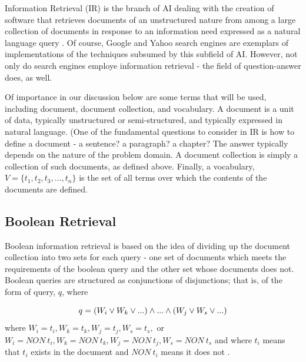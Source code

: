 Information Retrieval (IR) is the branch of AI dealing with the creation of software that retrieves documents of an unstructured nature from among a large collection of documents in response to an information need expressed as a natural language query \cite{manning_2008_introduction_ch1}.   Of course, Google and Yahoo search engines are exemplars of implementations of the techniques subsumed by this subfield of AI.  However, not only do search engines employe information retrieval - the field of question-answer does, as well.  

Of importance in our discussion below are some terms that will be used, including document, document collection, and vocabulary.  A document is a unit of data, typically unstructured or semi-structured, and typically expressed in natural language.  (One of the fundamental questions to consider in IR is how to define a document - a sentence? a paragraph? a chapter?  The answer typically depends on the nature of the problem domain.  A document collection is simply a collection of such documents, as defined above.  Finally, a vocabulary, $V=\{t_1,t_2,t_3,...,t_n\}$ is the set of all terms over which the contents of the documents are defined.

\subsection{Boolean Retrieval}

Boolean information retrieval is based on the idea of dividing up the document collection into two sets for each query - one set of documents which meets the requirements of the boolean query and the other set whose documents does not.  Boolean queries are structured as conjunctions of disjunctions; that is, of the form of query, $q$, where


\begin{equation}
q = (W_i \lor W_k \lor ...) \land ... \land (W_j \lor W_s \lor ...) \\
\end{equation}
where $W_i = t_i, W_k = t_k, W_j = t_j, W_s = t_s,$ or $W_i = NON\ t_i, W_k = NON\ t_k, W_j = NON\ t_j, W_s = NON\ t_s$ and where $t_i$ means that $t_i$ exists in the document and $NON\ t_i$ means it does not \cite{wiki:boolean_retrieval}.


